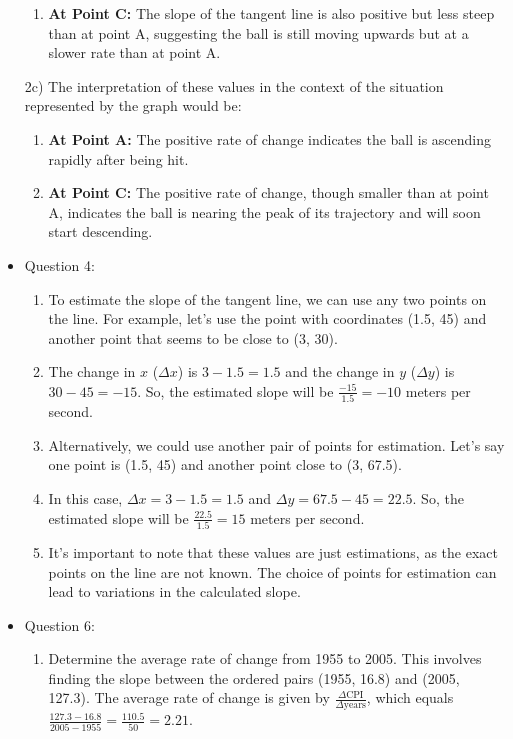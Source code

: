 \documentclass{article}
\begin{document}
\begin{itemize}
\begin{enumerate}
    \item \textbf{At Point C:} The slope of the tangent line is also positive but less steep than at point A, suggesting the ball is still moving upwards but at a slower rate than at point A.
\end{enumerate}
2c)
The interpretation of these values in the context of the situation represented by the graph would be:

\begin{enumerate}
    \item \textbf{At Point A:} The positive rate of change indicates the ball is ascending rapidly after being hit.
    
    \item \textbf{At Point C:} The positive rate of change, though smaller than at point A, indicates the ball is nearing the peak of its trajectory and will soon start descending.
\end{enumerate}

\item Question 4:
\begin{enumerate}
    \item To estimate the slope of the tangent line, we can use any two points on the line. For example, let's use the point with coordinates (1.5, 45) and another point that seems to be close to (3, 30).
    
    \item The change in \(x\) (\(\Delta x\)) is \(3 - 1.5 = 1.5\) and the change in \(y\) (\(\Delta y\)) is \(30 - 45 = -15\). So, the estimated slope will be \(\frac{-15}{1.5} = -10\) meters per second.
    
    \item Alternatively, we could use another pair of points for estimation. Let's say one point is (1.5, 45) and another point close to (3, 67.5).
    
    \item In this case, \(\Delta x = 3 - 1.5 = 1.5\) and \(\Delta y = 67.5 - 45 = 22.5\). So, the estimated slope will be \(\frac{22.5}{1.5} = 15\) meters per second.
    
    \item It's important to note that these values are just estimations, as the exact points on the line are not known. The choice of points for estimation can lead to variations in the calculated slope.
\end{enumerate}

\item Question 6:
\begin{enumerate}
    \item Determine the average rate of change from 1955 to 2005. This involves finding the slope between the ordered pairs (1955, 16.8) and (2005, 127.3). The average rate of change is given by \(\frac{\Delta \text{CPI}}{\Delta \text{years}}\), which equals \(\frac{127.3 - 16.8}{2005 - 1955} = \frac{110.5}{50} = 2.21\).
    

\end{enumerate}
\end{itemize}
\end{document}
